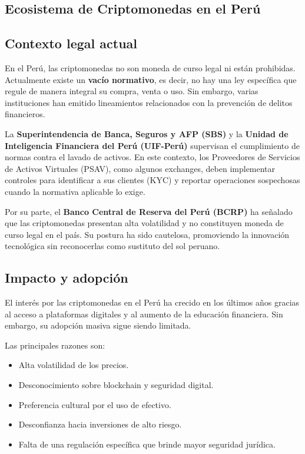 \documentclass[12pt,a4paper]{article}
\begin{document}
\subsection{Ecosistema de Criptomonedas en el Perú}

\subsection*{Contexto legal actual}

En el Perú, las criptomonedas no son moneda de curso legal ni están prohibidas. Actualmente existe un \textbf{vacío normativo}, es decir, no hay una ley específica que regule de manera integral su compra, venta o uso. Sin embargo, varias instituciones han emitido lineamientos relacionados con la prevención de delitos financieros.

La \textbf{Superintendencia de Banca, Seguros y AFP (SBS)} y la \textbf{Unidad de Inteligencia Financiera del Perú (UIF-Perú)} supervisan el cumplimiento de normas contra el lavado de activos. En este contexto, los Proveedores de Servicios de Activos Virtuales (PSAV), como algunos exchanges, deben implementar controles para identificar a sus clientes (KYC) y reportar operaciones sospechosas cuando la normativa aplicable lo exige.

Por su parte, el \textbf{Banco Central de Reserva del Perú (BCRP)} ha señalado que las criptomonedas presentan alta volatilidad y no constituyen moneda de curso legal en el país. Su postura ha sido cautelosa, promoviendo la innovación tecnológica sin reconocerlas como sustituto del sol peruano.

\subsection*{Impacto y adopción}

El interés por las criptomonedas en el Perú ha crecido en los últimos años gracias al acceso a plataformas digitales y al aumento de la educación financiera. Sin embargo, su adopción masiva sigue siendo limitada.

Las principales razones son:

\begin{itemize}
  \item Alta volatilidad de los precios.
  \item Desconocimiento sobre blockchain y seguridad digital.
  \item Preferencia cultural por el uso de efectivo.
  \item Desconfianza hacia inversiones de alto riesgo.
  \item Falta de una regulación específica que brinde mayor seguridad jurídica.
\end{itemize}
\end{document}
